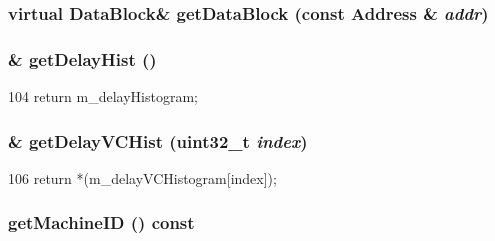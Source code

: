 \label{classAbstractController_ab14bc832dc06fbcb264f043d44a8915c}
\hypertarget{classAbstractController_ae014657139e530ad9d75dfd8f52302a4}{
\subsubsection[{getDataBlock}]{\setlength{\rightskip}{0pt plus 5cm}virtual {\bf DataBlock}\& getDataBlock (const {\bf Address} \& {\em addr})}}
\label{classAbstractController_ae014657139e530ad9d75dfd8f52302a4}
\hypertarget{classAbstractController_a8c0950c725a8898f340f7b267ff208be}{
\subsubsection[{getDelayHist}]{\& getDelayHist ()}}
\label{classAbstractController_a8c0950c725a8898f340f7b267ff208be}



\begin{DoxyCode}
104 { return m_delayHistogram; }
\end{DoxyCode}
\hypertarget{classAbstractController_a2fc801bc03037a99f6689b7d1bb4eda9}{
\subsubsection[{getDelayVCHist}]{\& getDelayVCHist ({\bf uint32\_\-t} {\em index})}}
\label{classAbstractController_a2fc801bc03037a99f6689b7d1bb4eda9}



\begin{DoxyCode}
106     { return *(m_delayVCHistogram[index]); }
\end{DoxyCode}
\hypertarget{classAbstractController_abaec6aa0c0c0f1d34472f0b3702d86c4}{
\subsubsection[{getMachineID}]{ getMachineID () const}}
\label{classAbstractController_abaec6aa0c0c0f1d34472f0b3702d86c4}



